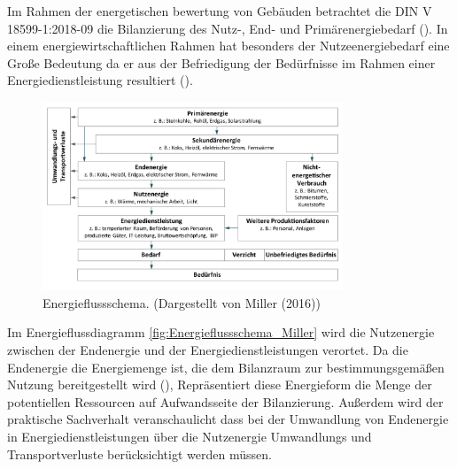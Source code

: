 Im Rahmen der energetischen bewertung von Gebäuden betrachtet die DIN V 18599-1:2018-09 die Bilanzierung des Nutz-, End- und Primärenergiebedarf (\cite{DIN18599.2018}).
In einem energiewirtschaftlichen Rahmen hat besonders der Nutzeenergiebedarf eine Große Bedeutung da er aus der Befriedigung der Bedürfnisse im Rahmen einer 
Energiedienstleistung resultiert (\cite[S. 107]{Miller.2016}).

\begin{figure}[H]
    \centering
    \includegraphics[width=0.8\textwidth]{../../Ressourcen/Abbildungen/Energiefluss_Miller.jpg}
    \caption{Energieflussschema. (Dargestellt von Miller (2016))}
    \label{fig:Energieflussschema_Miller}
\end{figure}

Im Energieflussdiagramm \eqref{fig:Energieflussschema_Miller} wird die Nutzenergie zwischen der Endenergie und der Energiedienstleistungen verortet. 
Da die Endenergie die Energiemenge ist, die dem Bilanzraum zur bestimmungsgemäßen Nutzung bereitgestellt wird (\cite[Kapitel 3.1.2]{DIN18599.2018}), 
Repräsentiert diese Energieform die Menge der potentiellen Ressourcen auf Aufwandsseite der Bilanzierung.
Außerdem wird der praktische Sachverhalt veranschaulicht dass bei der Umwandlung von Endenergie in Energiedienstleistungen über die Nutzenergie 
Umwandlungs und Transportverluste berücksichtigt werden müssen.

